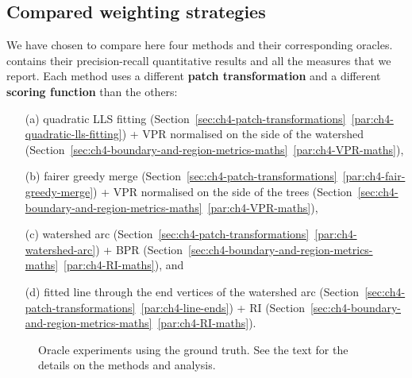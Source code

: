 \subsection{Compared weighting strategies}
We have chosen to compare here four methods and their corresponding oracles.  contains their precision-recall quantitative results and  all the measures that we report. Each method uses a different {\bf patch transformation} and a different {\bf scoring function} than the others: 
\begin{enumerate}
 \item[(a)] quadratic LLS fitting (Section~\ref*{sec:ch4-patch-transformations}~\ref{par:ch4-quadratic-lls-fitting}) + VPR normalised on the side of the watershed (Section~\ref*{sec:ch4-boundary-and-region-metrics-maths}~\ref{par:ch4-VPR-maths}),
 \item[(b)] fairer greedy merge (Section~\ref*{sec:ch4-patch-transformations}~\ref{par:ch4-fair-greedy-merge}) + VPR normalised on the side of the trees (Section~\ref*{sec:ch4-boundary-and-region-metrics-maths}~\ref{par:ch4-VPR-maths}),
 \item[(c)] watershed arc (Section~\ref*{sec:ch4-patch-transformations}~\ref{par:ch4-watershed-arc}) + BPR (Section~\ref*{sec:ch4-boundary-and-region-metrics-maths}~\ref{par:ch4-RI-maths}), and 
 \item[(d)] %
 fitted line through the end vertices of the watershed arc (Section~\ref*{sec:ch4-patch-transformations}~\ref{par:ch4-line-ends}) + RI (Section~\ref*{sec:ch4-boundary-and-region-metrics-maths}~\ref{par:ch4-RI-maths}).
\end{enumerate}

\begin{figure}[ht!]
\centering
\caption[Oracle experiments using the ground truth - plots]{Oracle experiments using the ground truth. See the text for the details on the methods and analysis.}
\label{fig:oracle}
\end{figure}



